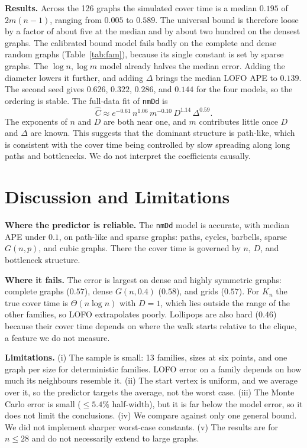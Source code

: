 \documentclass{article}
\begin{document}
\textbf{Results.} Across the 126 graphs the simulated cover time is a median $0.195$ of $2m(n-1)$, ranging from $0.005$ to $0.589$. The universal bound is therefore loose by a factor of about five at the median and by about two hundred on the densest graphs. The calibrated bound model fails badly on the complete and dense random graphs (Table~\ref{tab:fam}), because its single constant is set by sparse graphs. The $\log n,\log m$ model already halves the median error. Adding the diameter lowers it further, and adding $\Delta$ brings the median LOFO APE to $0.139$. The second seed gives $0.626$, $0.322$, $0.286$, and $0.144$ for the four models, so the ordering is stable. The full-data fit of \texttt{nmDd} is
\[
\hat C \approx e^{-0.61}\, n^{1.06}\, m^{-0.10}\, D^{1.14}\, \Delta^{0.59}.
\]
The exponents of $n$ and $D$ are both near one, and $m$ contributes little once $D$ and $\Delta$ are known. This suggests that the dominant structure is path-like, which is consistent with the cover time being controlled by slow spreading along long paths and bottlenecks. We do not interpret the coefficients causally.

\section{Discussion and Limitations}
\textbf{Where the predictor is reliable.} The \texttt{nmDd} model is accurate, with median APE under $0.1$, on path-like and sparse graphs: paths, cycles, barbells, sparse $G(n,p)$, and cubic graphs. There the cover time is governed by $n$, $D$, and bottleneck structure.

\textbf{Where it fails.} The error is largest on dense and highly symmetric graphs: complete graphs ($0.57$), dense $G(n,0.4)$ ($0.58$), and grids ($0.57$). For $K_n$ the true cover time is $\Theta(n\log n)$ with $D=1$, which lies outside the range of the other families, so LOFO extrapolates poorly. Lollipops are also hard ($0.46$) because their cover time depends on where the walk starts relative to the clique, a feature we do not measure.

\textbf{Limitations.} (i) The sample is small: 13 families, sizes at six points, and one graph per size for deterministic families. LOFO error on a family depends on how much its neighbours resemble it. (ii) The start vertex is uniform, and we average over it, so the predictor targets the average, not the worst case. (iii) The Monte Carlo error is small ($\le 5.4\%$ half-width), but it is far below the model error, so it does not limit the conclusions. (iv) We compare against only one general bound. We did not implement sharper worst-case constants. (v) The results are for $n\le 28$ and do not necessarily extend to large graphs.
\end{document}
